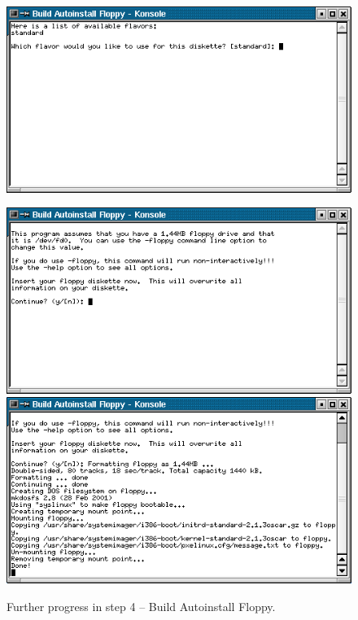 \begin{figure}[h!]
  \begin{center}
    \centerline{\includegraphics[scale=\imgscale]{figs/6ba_sbs-autoinstall-flpy1}}
    \vspace{\imgvskip}
    \centerline{
      \includegraphics[scale=\imgscale]{figs/6bb_sbs-autoinstall-flpy2}
      \hspace{\imghskip}
      \includegraphics[scale=\imgscale]{figs/6bc_sbs-autoinstall-flpy3}
      }
    \caption{Further progress in step 4 -- Build Autoinstall Floppy.}
    \label{fig:sbs-autoinstall-flpy1}
  \end{center}
\end{figure}

